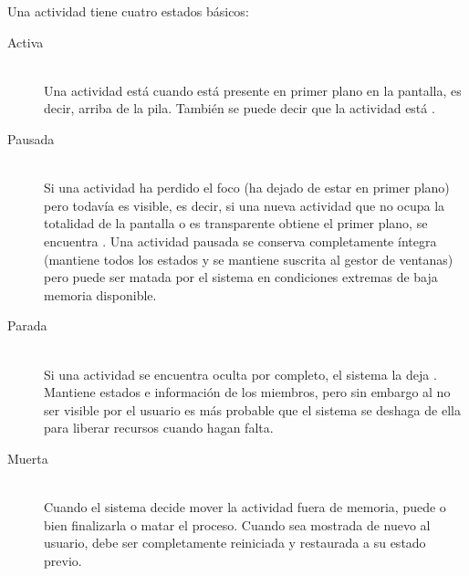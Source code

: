 Una actividad tiene cuatro estados básicos:

\begin{description}
    \item[Activa] \hfill \\
     Una actividad está  cuando está presente en primer plano en la pantalla, es decir, arriba de la pila. También se puede decir que la actividad está .

    \item[Pausada] \hfill \\
    Si una actividad ha perdido el foco (ha dejado de estar en primer plano) pero todavía es visible, es decir, si una nueva actividad que no ocupa la totalidad de la pantalla o es transparente obtiene el primer plano, se encuentra . Una actividad pausada se conserva completamente íntegra (mantiene todos los estados y se mantiene suscrita al gestor de ventanas) pero puede ser matada por el sistema en condiciones extremas de baja memoria disponible.

    \item[Parada] \hfill \\
    Si una actividad se encuentra oculta por completo, el sistema la deja . Mantiene estados e información de los miembros, pero sin embargo al no ser visible por el usuario es más probable que el sistema se deshaga de ella para liberar recursos cuando hagan falta.
    
    \item[Muerta] \hfill \\
    Cuando el sistema decide mover la actividad fuera de memoria, puede o bien finalizarla o matar el proceso. Cuando sea mostrada de nuevo al usuario, debe ser completamente reiniciada y restaurada a su estado previo.
    
\end{description}

